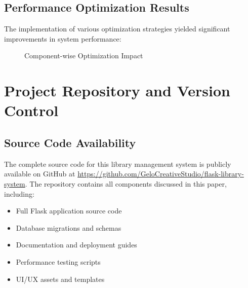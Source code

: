 \documentclass{article}
\begin{document}
\subsection{Performance Optimization Results}

The implementation of various optimization strategies yielded significant improvements in system performance:

\begin{figure}[h]
\centering
{}
\caption{Component-wise Optimization Impact}
\end{figure}

\section{Project Repository and Version Control}

\subsection{Source Code Availability}
The complete source code for this library management system is publicly available on GitHub at \url{https://github.com/GeloCreativeStudio/flask-library-system}\cite{libsys2024}. The repository contains all components discussed in this paper, including:

\begin{itemize}
    \item Full Flask application source code
    \item Database migrations and schemas
    \item Documentation and deployment guides
    \item Performance testing scripts
    \item UI/UX assets and templates
\end{itemize}
\end{document}
